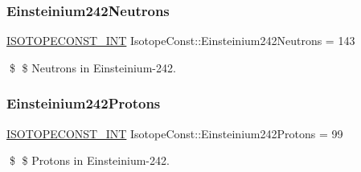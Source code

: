 \subsubsection{\texorpdfstring{Einsteinium242\+Neutrons}{Einsteinium242Neutrons}}
{\footnotesize\ttfamily \mbox{\hyperlink{group___isotope_const-_macros_ga5f18360b3e99483a35c32d789e62621c}{I\+S\+O\+T\+O\+P\+E\+C\+O\+N\+S\+T\+\_\+\+I\+NT}} Isotope\+Const\+::\+Einsteinium242\+Neutrons = 143}

\$ \$ Neutrons in Einsteinium-\/242. \mbox{\label{group___isotope_const-_einsteinium-_es242_ga6081d61888d538ff60ceac0518a5804c}} 
\subsubsection{\texorpdfstring{Einsteinium242\+Protons}{Einsteinium242Protons}}
{\footnotesize\ttfamily \mbox{\hyperlink{group___isotope_const-_macros_ga5f18360b3e99483a35c32d789e62621c}{I\+S\+O\+T\+O\+P\+E\+C\+O\+N\+S\+T\+\_\+\+I\+NT}} Isotope\+Const\+::\+Einsteinium242\+Protons = 99}

\$ \$ Protons in Einsteinium-\/242. 